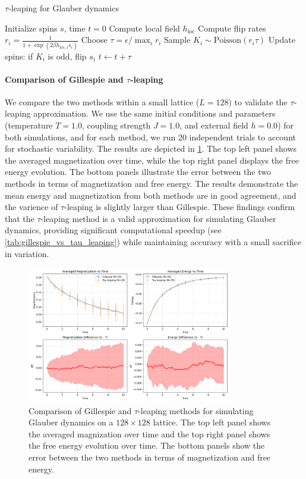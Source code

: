 \documentclass[11pt,a4paper]{article}
\begin{document}
\begin{algorithm}[h]
\caption{$\tau$-leaping for Glauber dynamics}
\begin{algorithmic}[1]
\State Initialize spins $s$, time $t=0$
    \State Compute local field $h_{\text{loc}}$
    \State Compute flip rates $r_i = \frac{1}{1 + \exp(2 \beta h_{\text{loc},i} s_i)}$
    \State Choose $\tau = \epsilon / \max_i r_i$
    \State Sample $K_i \sim \mathrm{Poisson}(r_i \tau)$
    \State Update spins: if $K_i$ is odd, flip $s_i$
    \State $t \gets t + \tau$
\EndWhile
\end{algorithmic}
\end{algorithm}

\paragraph{Comparison of Gillespie and $\tau$-leaping} We compare the two methods within a small lattice ($L=128$) to validate the $\tau$-leaping approximation. 
We use the same initial conditions and parameters (temperature $T = 1.0$, coupling strength $J = 1.0$, and external field $h = 0.0$) for both simulations, and for each method, we run 20 independent trials to account for stochastic variability. 
The results are depicted in \cref{fig:gillespie_vs_tau_leaping}. 
The top left panel shows the averaged magnetization over time, while the top right panel displays the free energy evolution. The bottom panels illustrate the error between the two methods in terms of magnetization and free energy. 
The results demonstrate the mean energy and magnetization from both methods are in good agreement, and the varience of $\tau$-leaping is slightly larger than Gillespie. 
These findings confirm that the $\tau$-leaping method is a valid approximation for simulating Glauber dynamics, providing significant computational speedup (see \cref{tab:gillespie_vs_tau_leaping}) while maintaining accuracy with a small sacrifice in variation.
\begin{figure}
    \centering
    \includegraphics[width=0.8\textwidth]{fig/ising_L128_ell8.0_sigma1.0_tau1.0_m00.2_beta1.0_eps0.02_compare_N20.png}
    \caption{Comparison of Gillespie and $\tau$-leaping methods for simulating Glauber dynamics on a $128 \times 128$ lattice. The top left panel shows the averaged magnization over time and the top right panel shows the free energy evolution over time. The bottom panels show the error between the two methods in terms of magnetization and free energy.}
    \label{fig:gillespie_vs_tau_leaping}
\end{figure}
\end{document}
